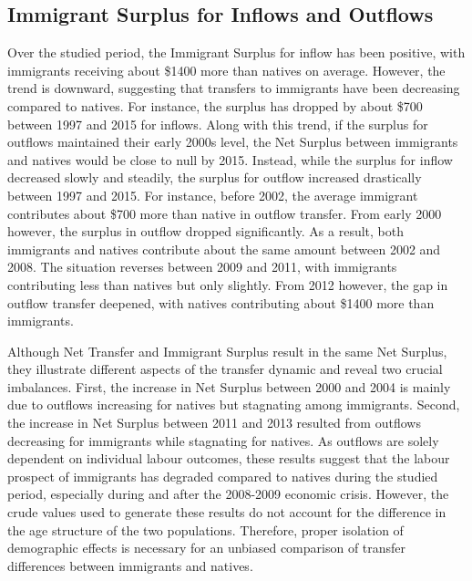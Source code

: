 \subsection{Immigrant Surplus for Inflows and Outflows}
Over the studied period, the Immigrant Surplus for inflow has been positive, with immigrants receiving about \$\num{1400} more than natives on average.
However, the trend is downward, suggesting that transfers to immigrants have been decreasing compared to natives.
For instance, the surplus has dropped by about \$\num{700} between 1997 and 2015 for inflows. Along with this trend, if the surplus for outflows maintained their early 2000s level, the Net Surplus between immigrants and natives would be close to null by 2015.
Instead, while the surplus for inflow decreased slowly and steadily, the surplus for outflow increased drastically between 1997 and 2015.
For instance, before 2002, the average immigrant contributes about \$\num{700} more than native in outflow transfer.
From early 2000 however, the surplus in outflow dropped significantly. As a result, both immigrants and natives contribute about the same amount between 2002 and 2008.
The situation reverses between 2009 and 2011, with immigrants contributing less than natives but only slightly.
From 2012 however, the gap in outflow transfer deepened, with natives contributing about \$\num{1400} more than immigrants.

\vspace{0.7em}\par
Although Net Transfer and Immigrant Surplus result in the same Net Surplus, they illustrate different aspects of the transfer dynamic and reveal two crucial imbalances.
First, the increase in Net Surplus between 2000 and 2004 is mainly due to outflows increasing for natives but stagnating among immigrants.
Second, the increase in Net Surplus between 2011 and 2013 resulted from outflows decreasing for immigrants while stagnating for natives.
As outflows are solely dependent on individual labour outcomes, these results suggest that the labour prospect of immigrants has degraded compared to natives during the studied period, especially during and after the 2008-2009 economic crisis.
However, the crude values used to generate these results do not account for the difference in the age structure of the two populations.
Therefore, proper isolation of demographic effects is necessary for an unbiased comparison of transfer differences between immigrants and natives.
















